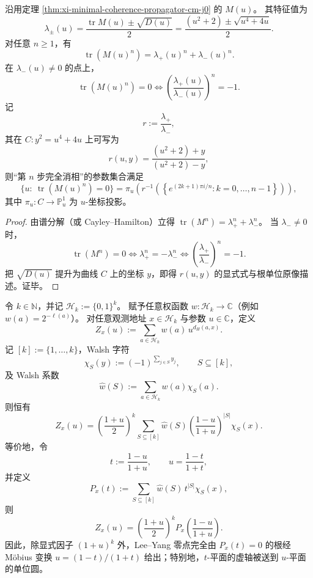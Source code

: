 \begin{proposition}[相干消相时刻的根单位判据]\label{prop:xi-minimal-propagator-root-of-unity-criterion}
沿用定理 \ref{thm:xi-minimal-coherence-propagator-cm-j0} 的 \(M(u)\)。
其特征值为
\[
\lambda_\pm(u)
=
\frac{\operatorname{tr}M(u)\pm\sqrt{D(u)}}{2}
=
\frac{(u^2+2)\pm\sqrt{u^4+4u}}{2}.
\]
对任意 \(n\ge 1\)，有
\[
\operatorname{tr}(M(u)^n)=\lambda_+(u)^n+\lambda_-(u)^n.
\]
在 \(\lambda_-(u)\neq 0\) 的点上，
\[
\operatorname{tr}(M(u)^n)=0
\iff
\left(\frac{\lambda_+(u)}{\lambda_-(u)}\right)^n=-1.
\]
记
\[
r:=\frac{\lambda_+}{\lambda_-},
\]
其在 \(C:y^2=u^4+4u\) 上可写为
\[
r(u,y)=\frac{(u^2+2)+y}{(u^2+2)-y},
\]
则“第 \(n\) 步完全消相”的参数集合满足
\[
\{u:\ \operatorname{tr}(M(u)^n)=0\}
=
\pi_u\!\left(
r^{-1}\!\left(\left\{e^{(2k+1)\pi i/n}:k=0,\dots,n-1\right\}\right)
\right),
\]
其中 \(\pi_u:C\to\mathbb P^1_u\) 为 \(u\)-坐标投影。
\end{proposition}

\begin{proof}
由谱分解（或 Cayley--Hamilton）立得
\(
\operatorname{tr}(M^n)=\lambda_+^n+\lambda_-^n
\)。
当 \(\lambda_-\neq 0\) 时，
\[
\operatorname{tr}(M^n)=0
\iff
\lambda_+^n=-\lambda_-^n
\iff
\left(\frac{\lambda_+}{\lambda_-}\right)^n=-1.
\]
把 \(\sqrt{D(u)}\) 提升为曲线 \(C\) 上的坐标 \(y\)，即得 \(r(u,y)\) 的显式式与根单位原像描述。证毕。
\end{proof}

\begin{theorem}\label{thm:xi-hypercube-walsh-joukowsky-leyang-explicit}
令 \(k\in\mathbb N\)，并记 \(\mathcal H_k:=\{0,1\}^k\)。
赋予任意权函数 \(w:\mathcal H_k\to\mathbb C\)（例如 \(w(a)=2^{-\ell(a)}\)）。
对任意观测地址 \(x\in\mathcal H_k\) 与参数 \(u\in\mathbb C\)，定义
\[
Z_x(u):=\sum_{a\in\mathcal H_k}w(a)\,u^{d_H(a,x)}.
\]
记 \([k]:=\{1,\dots,k\}\)，Walsh 字符
\[
\chi_S(y):=(-1)^{\sum_{j\in S}y_j},
\qquad
S\subseteq[k],
\]
及 Walsh 系数
\[
\widehat w(S):=\sum_{a\in\mathcal H_k}w(a)\chi_S(a).
\]
则恒有
\[
Z_x(u)
=
\left(\frac{1+u}{2}\right)^k
\sum_{S\subseteq[k]}
\widehat w(S)
\left(\frac{1-u}{1+u}\right)^{|S|}
\chi_S(x).
\]
等价地，令
\[
t:=\frac{1-u}{1+u},
\qquad
u=\frac{1-t}{1+t},
\]
并定义
\[
P_x(t):=\sum_{S\subseteq[k]}\widehat w(S)\,t^{|S|}\chi_S(x),
\]
则
\[
Z_x(u)=\left(\frac{1+u}{2}\right)^k P_x\!\left(\frac{1-u}{1+u}\right).
\]
因此，除显式因子 \((1+u)^k\) 外，Lee--Yang 零点完全由 \(P_x(t)=0\) 的根经 Möbius 变换 \(u=(1-t)/(1+t)\) 给出；特别地，\(t\)-平面的虚轴被送到 \(u\)-平面的单位圆。
\end{theorem}

